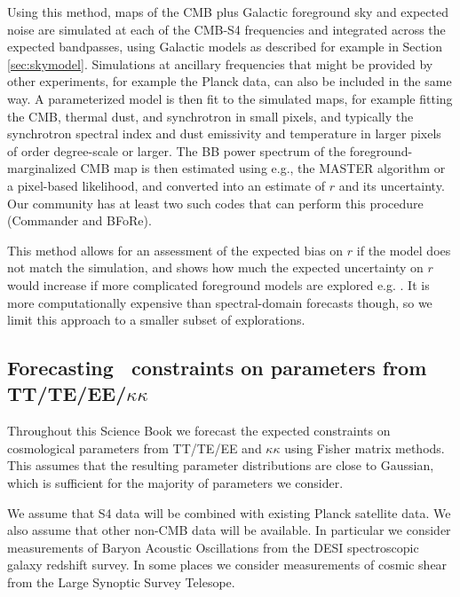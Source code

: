 Using this method, maps of the CMB plus Galactic foreground sky and expected noise are simulated at each of the CMB-S4 frequencies and integrated across the expected bandpasses, using Galactic models as described for example in Section \ref{sec:skymodel}. Simulations at ancillary frequencies that might be provided by other experiments, for example the Planck data, can also be included in the same way. A parameterized model is then fit to the simulated maps, for example fitting the CMB, thermal dust, and synchrotron in small pixels, and typically the synchrotron spectral index and dust emissivity and temperature in larger pixels of order degree-scale or larger. The BB power spectrum of the foreground-marginalized CMB map is then estimated using e.g., the MASTER \cite{Hivon:2001jp} algorithm or a pixel-based likelihood, and converted into an estimate of $r$ and its uncertainty. Our community has at least two such codes that can perform this procedure (Commander and BFoRe).

This method allows for an assessment of the expected bias on $r$ if the model does not match the simulation, and shows how much the expected uncertainty on $r$ would increase if more complicated foreground models are explored e.g. \cite{ArmitageCaplan:2011sn,Remazeilles:2015hpa}. It is more computationally expensive than spectral-domain forecasts though, so we limit this approach to a smaller subset of explorations. 

\subsection{Forecasting \cmbexp\ constraints on parameters from TT/TE/EE/$\kappa\kappa$}

Throughout this Science Book we forecast the expected constraints on cosmological parameters from TT/TE/EE and $\kappa\kappa$ using Fisher matrix methods. This assumes that the resulting parameter distributions are close to Gaussian, which is sufficient for the majority of parameters we consider.

We assume that S4 data will be combined with existing Planck satellite data. We also assume that other non-CMB data will be available. In particular we consider measurements of Baryon Acoustic Oscillations from the DESI spectroscopic galaxy redshift survey. In some places we consider measurements of cosmic shear from the Large Synoptic Survey Telesope.


